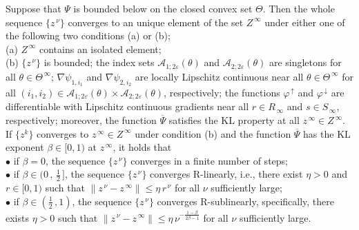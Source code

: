 \documentclass{siamart}
\newcommand{\wh}{\widehat}
\begin{document}
\begin{proposition}\label{proposition: full convergence}
Suppose that $\Psi$ is bounded below on the closed convex set $\Theta$.
Then the whole sequence $\{z^{\,\nu}\}$ converges to an unique element of the set $Z^{\, \infty}$
under either one of the following two conditions (a) or (b);\\[0.05in]
(a) $Z^{\,\infty}$ contains an isolated element;\\[0.05in]
(b) $\{z^{\,\nu}\}$ is bounded; the index sets
$\mathcal{A}_{1;2\varepsilon}(\theta)$ and $\mathcal{A}_{2;2\varepsilon}(\theta)$ are singletons for all $\theta\in \Theta^{\,\infty}$;
$\nabla \psi_{1,i_1}$ and $\nabla \psi_{2,i_2}$ are locally Lipschitz continuous near all $\theta\in \Theta^{\,\infty}$ for
all $(i_1,i_2)\in \mathcal{A}_{1;2\varepsilon}(\theta)\times \mathcal{A}_{2;2\varepsilon}(\theta)$, respectively;
the functions $\varphi^{\,\uparrow}$ and $\varphi^{\,\downarrow}$ are differentiable with Lipschitz continuous
gradients near all $r \in R_{\,\infty}$ and $s \in S_{\,\infty}$, respectively; moreover,
the function $\overline\Psi$ satisfies the KL property at all $z^{\,\infty}\in Z^{\,\infty}$.\\[0.05in]
If $\{z^k\}$ converges to $z^{\,\infty}\in Z^{\,\infty}$ under condition  (b) and the function $\overline\Psi$ has the KL exponent $\beta\in [0,1)$
at $z^{\,\infty}$, it holds that\\[0.05in]
$\bullet $ if $\beta = 0$, the sequence $\{z^{\,\nu}\}$ converges in a finite number of steps;\\[0.05in]
$\bullet $ if $\beta \in (0\,,\,\frac{1}{2}\,]$, the sequence $\{z^{\,\nu}\}$ converges R-linearly, i.e.,
there exist $\eta>0$  and $r \in [0, 1)$ such that $\|z^{\,\nu} - z^{\,\infty}\|\leq \eta\, r^{\,\nu}$ for all $\nu$ sufficiently large;\\[0.05in]
$\bullet $ if $\beta \in (\frac{1}{2}\,,1)$, the sequence $\{z^{\,\nu}\}$ converges R-sublinearly,
specifically, there exists $\eta > 0$ such that $\|z^{\,\nu} - z^{\,\infty}\|\leq \eta\, \nu^{-\frac{1-\beta}{2\beta-1}}$ for all $\nu$ sufficiently large.
\end{proposition}
\end{document}
